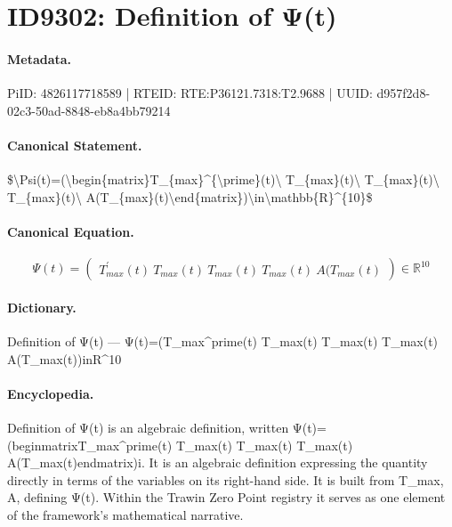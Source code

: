 \section*{ID9302: Definition of Ψ(t)}
\paragraph{Metadata.}
PiID: 4826117718589 | RTEID: RTE:P36121.7318:T2.9688 | UUID: d957f2d8-02c3-50ad-8848-eb8a4bb79214

\paragraph{Canonical Statement.}
\$\textbackslash{}Psi(t)=(\textbackslash{}begin\{matrix\}T\_\{max\}\textasciicircum{}\{\textbackslash{}prime\}(t)\textbackslash{} T\_\{max\}(t)\textbackslash{} T\_\{max\}(t)\textbackslash{} T\_\{max\}(t)\textbackslash{} A(T\_\{max\}(t)\textbackslash{}end\{matrix\})\textbackslash{}in\textbackslash{}mathbb\{R\}\textasciicircum{}\{10\}\$

\paragraph{Canonical Equation.}
\[
\Psi(t)=(\begin{matrix}T_{max}^{\prime}(t)\ T_{max}(t)\ T_{max}(t)\ T_{max}(t)\ A(T_{max}(t)\end{matrix})\in\mathbb{R}^{10}
\]

\paragraph{Dictionary.}
Definition of Ψ(t) — Ψ(t)=(T\_max\textasciicircum{}prime(t) T\_max(t) T\_max(t) T\_max(t) A(T\_max(t))inR\textasciicircum{}10

\paragraph{Encyclopedia.}
Definition of Ψ(t) is an algebraic definition, written Ψ(t)=(beginmatrixT\_max\textasciicircum{}prime(t) T\_max(t) T\_max(t) T\_max(t) A(T\_max(t)endmatrix)i. It is an algebraic definition expressing the quantity directly in terms of the variables on its right-hand side. It is built from T\_max, A, defining Ψ(t). Within the Trawin Zero Point registry it serves as one element of the framework's mathematical narrative.
